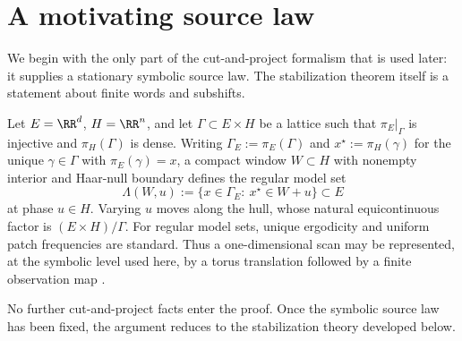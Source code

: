 \section{A motivating source law}\label{sec:superspace}

We begin with the only part of the cut-and-project formalism that is used later: it supplies a stationary symbolic source law. The stabilization theorem itself is a statement about finite words and subshifts.

Let $E=\RR^d$, $H=\RR^n$, and let $\Gamma\subset E\times H$ be a lattice such that $\pi_E|_{\Gamma}$ is injective and $\pi_H(\Gamma)$ is dense. Writing $\Gamma_E:=\pi_E(\Gamma)$ and $x^\star:=\pi_H(\gamma)$ for the unique $\gamma\in\Gamma$ with $\pi_E(\gamma)=x$, a compact window $W\subset H$ with nonempty interior and Haar-null boundary defines the regular model set
\[
\Lambda(W,u):=\{x\in\Gamma_E:\ x^\star\in W+u\}\subset E
\]
at phase $u\in H$. Varying $u$ moves along the hull, whose natural equicontinuous factor is $(E\times H)/\Gamma$. For regular model sets, unique ergodicity and uniform patch frequencies are standard. Thus a one-dimensional scan may be represented, at the symbolic level used here, by a torus translation followed by a finite observation map \cite{Moody2000,BaakeGrimm2013}.

No further cut-and-project facts enter the proof. Once the symbolic source law has been fixed, the argument reduces to the stabilization theory developed below.
